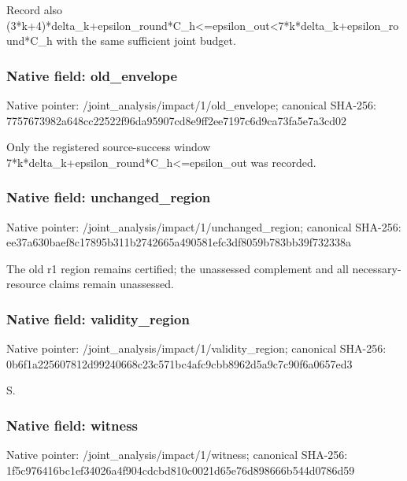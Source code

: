 \documentclass[10pt,a4paper]{article}
\begin{document}
\begingroup\raggedright\sloppy Record also (3*k+4)*delta\_\allowbreak{}k+epsilon\_\allowbreak{}round*C\_\allowbreak{}h<=\allowbreak{}epsilon\_\allowbreak{}out<7*k*delta\_\allowbreak{}k+epsilon\_\allowbreak{}round*C\_\allowbreak{}h with the same sufficient joint budget.\par\endgroup

\subsubsection{Native field: old\_\allowbreak{}envelope}
Native pointer: /joint\_\allowbreak{}analysis/impact/1/old\_\allowbreak{}envelope; canonical SHA-256: 7757673982a648cc22522f96da95907cd8e9ff2ee7197c6d9ca73fa5e7a3cd02

\begingroup\raggedright\sloppy Only the registered source-success window 7*k*delta\_\allowbreak{}k+epsilon\_\allowbreak{}round*C\_\allowbreak{}h<=\allowbreak{}epsilon\_\allowbreak{}out was recorded.\par\endgroup

\subsubsection{Native field: unchanged\_\allowbreak{}region}
Native pointer: /joint\_\allowbreak{}analysis/impact/1/unchanged\_\allowbreak{}region; canonical SHA-256: ee37a630baef8c17895b311b2742665a490581efc3df8059b783bb39f732338a

\begingroup\raggedright\sloppy The old r1 region remains certified;\allowbreak{} the unassessed complement and all necessary-resource claims remain unassessed.\par\endgroup

\subsubsection{Native field: validity\_\allowbreak{}region}
Native pointer: /joint\_\allowbreak{}analysis/impact/1/validity\_\allowbreak{}region; canonical SHA-256: 0b6f1a225607812d99240668c23c571bc4afc9cbb8962d5a9c7c90f6a0657ed3

\begingroup\raggedright\sloppy S.\par\endgroup

\subsubsection{Native field: witness}
Native pointer: /joint\_\allowbreak{}analysis/impact/1/witness; canonical SHA-256: 1f5c976416bc1ef34026a4f904cdcbd810c0021d65e76d898666b544d0786d59
\end{document}
